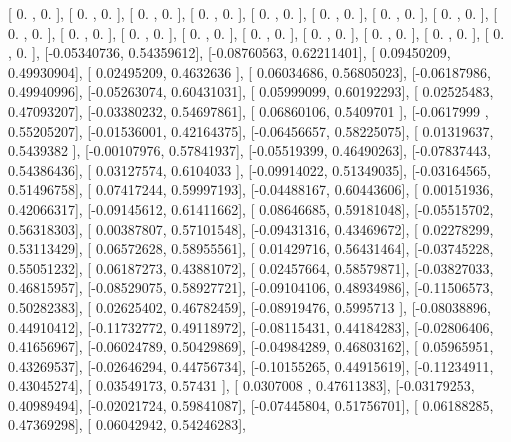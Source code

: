 \documentclass{article}
\begin{document}
       [ 0.        ,  0.        ],
       [ 0.        ,  0.        ],
       [ 0.        ,  0.        ],
       [ 0.        ,  0.        ],
       [ 0.        ,  0.        ],
       [ 0.        ,  0.        ],
       [ 0.        ,  0.        ],
       [ 0.        ,  0.        ],
       [ 0.        ,  0.        ],
       [ 0.        ,  0.        ],
       [ 0.        ,  0.        ],
       [ 0.        ,  0.        ],
       [ 0.        ,  0.        ],
       [ 0.        ,  0.        ],
       [ 0.        ,  0.        ],
       [ 0.        ,  0.        ],
       [ 0.        ,  0.        ],
       [-0.05340736,  0.54359612],
       [-0.08760563,  0.62211401],
       [ 0.09450209,  0.49930904],
       [ 0.02495209,  0.4632636 ],
       [ 0.06034686,  0.56805023],
       [-0.06187986,  0.49940996],
       [-0.05263074,  0.60431031],
       [ 0.05999099,  0.60192293],
       [ 0.02525483,  0.47093207],
       [-0.03380232,  0.54697861],
       [ 0.06860106,  0.5409701 ],
       [-0.0617999 ,  0.55205207],
       [-0.01536001,  0.42164375],
       [-0.06456657,  0.58225075],
       [ 0.01319637,  0.5439382 ],
       [-0.00107976,  0.57841937],
       [-0.05519399,  0.46490263],
       [-0.07837443,  0.54386436],
       [ 0.03127574,  0.6104033 ],
       [-0.09914022,  0.51349035],
       [-0.03164565,  0.51496758],
       [ 0.07417244,  0.59997193],
       [-0.04488167,  0.60443606],
       [ 0.00151936,  0.42066317],
       [-0.09145612,  0.61411662],
       [ 0.08646685,  0.59181048],
       [-0.05515702,  0.56318303],
       [ 0.00387807,  0.57101548],
       [-0.09431316,  0.43469672],
       [ 0.02278299,  0.53113429],
       [ 0.06572628,  0.58955561],
       [ 0.01429716,  0.56431464],
       [-0.03745228,  0.55051232],
       [ 0.06187273,  0.43881072],
       [ 0.02457664,  0.58579871],
       [-0.03827033,  0.46815957],
       [-0.08529075,  0.58927721],
       [-0.09104106,  0.48934986],
       [-0.11506573,  0.50282383],
       [ 0.02625402,  0.46782459],
       [-0.08919476,  0.5995713 ],
       [-0.08038896,  0.44910412],
       [-0.11732772,  0.49118972],
       [-0.08115431,  0.44184283],
       [-0.02806406,  0.41656967],
       [-0.06024789,  0.50429869],
       [-0.04984289,  0.46803162],
       [ 0.05965951,  0.43269537],
       [-0.02646294,  0.44756734],
       [-0.10155265,  0.44915619],
       [-0.11234911,  0.43045274],
       [ 0.03549173,  0.57431   ],
       [ 0.0307008 ,  0.47611383],
       [-0.03179253,  0.40989494],
       [-0.02021724,  0.59841087],
       [-0.07445804,  0.51756701],
       [ 0.06188285,  0.47369298],
       [ 0.06042942,  0.54246283],
\end{document}
